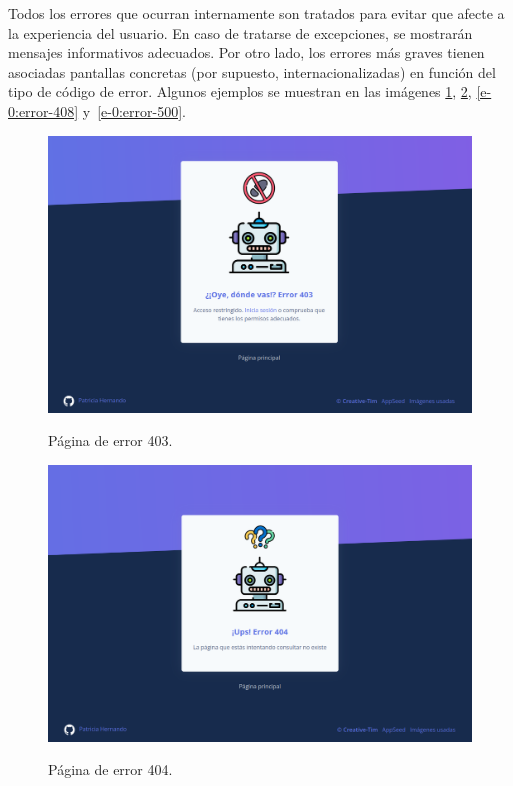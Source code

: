 Todos los errores que ocurran internamente son tratados para evitar que afecte a la experiencia del usuario. En caso de tratarse de excepciones, se mostrarán mensajes informativos adecuados. Por otro lado, los errores más graves tienen asociadas pantallas concretas (por supuesto, internacionalizadas) en función del tipo de código de error. Algunos ejemplos se muestran en las imágenes \ref{e-0:error-403}, \ref{e-0:error-404}, \ref{e-0:error-408} y~\ref{e-0:error-500}.

\begin{figure}[h]
	\caption[Manual de usuario: error 403]{Página de error 403.}
	\centering
	\includegraphics[scale=0.27]{../img/anexos/user_guide/0_error_403}
	\label{e-0:error-403}
\end{figure}

\begin{figure}[h]
	\caption[Manual de usuario: error 404]{Página de error 404.}
	\centering
	\includegraphics[scale=0.27]{../img/anexos/user_guide/0_error_404}
	\label{e-0:error-404}
\end{figure}

